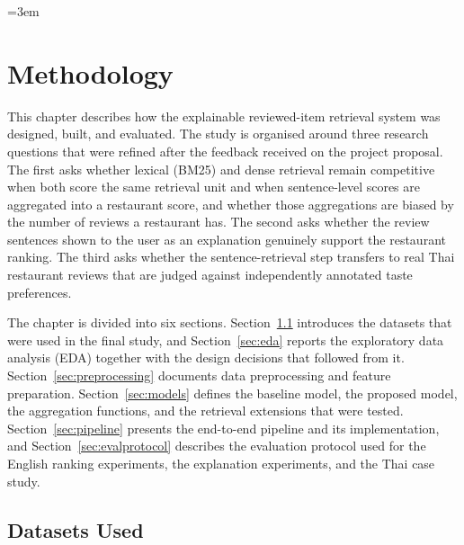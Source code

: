 \providecommand{\mpnet}{\texttt{paraphrase-\allowbreak multilingual-\allowbreak mpnet-\allowbreak base-\allowbreak v2}}
\providecommand{\cemodel}{\texttt{ms-marco-\allowbreak MiniLM-\allowbreak L-6-\allowbreak v2}}
\emergencystretch=3em
\providecommand{\pending}[1]{\textbf{[PENDING: #1]}}

\chapter{Methodology}
\label{chap:methodology}

This chapter describes how the explainable reviewed-item retrieval system was designed, built, and evaluated. The study is organised around three research questions that were refined after the feedback received on the project proposal. The first asks whether lexical (BM25) and dense retrieval remain competitive when both score the same retrieval unit and when sentence-level scores are aggregated into a restaurant score, and whether those aggregations are biased by the number of reviews a restaurant has. The second asks whether the review sentences shown to the user as an explanation genuinely support the restaurant ranking. The third asks whether the sentence-retrieval step transfers to real Thai restaurant reviews that are judged against independently annotated taste preferences.

The chapter is divided into six sections. Section~\ref{sec:datasets} introduces the datasets that were used in the final study, and Section~\ref{sec:eda} reports the exploratory data analysis (EDA) together with the design decisions that followed from it. Section~\ref{sec:preprocessing} documents data preprocessing and feature preparation. Section~\ref{sec:models} defines the baseline model, the proposed model, the aggregation functions, and the retrieval extensions that were tested. Section~\ref{sec:pipeline} presents the end-to-end pipeline and its implementation, and Section~\ref{sec:evalprotocol} describes the evaluation protocol used for the English ranking experiments, the explanation experiments, and the Thai case study.

\section{Datasets Used}
\label{sec:datasets}

